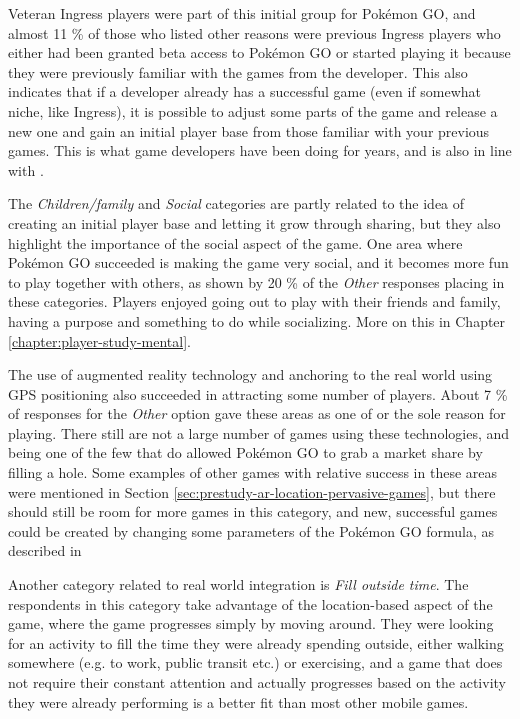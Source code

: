 Veteran Ingress players were part of this initial group for Pokémon GO, and almost 11 \% of those who listed other reasons were previous Ingress players who either had been granted beta access to Pokémon GO or started playing it because they were previously familiar with the games from the developer. This also indicates that if a developer already has a successful game (even if somewhat niche, like Ingress), it is possible to adjust some parts of the game and release a new one and gain an initial player base from those familiar with your previous games. This is what game developers have been doing for years, and is also in line with .

The \emph{Children/family} and \emph{Social} categories are partly related to the idea of creating an initial player base and letting it grow through sharing, but they also highlight the importance of the social aspect of the game. One area where Pokémon GO succeeded is making the game very social, and it becomes more fun to play together with others, as shown by 20 \% of the \emph{Other} responses placing in these categories. Players enjoyed going out to play with their friends and family, having a purpose and something to do while socializing. More on this in Chapter \ref{chapter:player-study-mental}. 

The use of augmented reality technology and anchoring to the real world using GPS positioning also succeeded in attracting some number of players. About 7 \% of responses for the \emph{Other} option gave these areas as one of or the sole reason for playing. There still are not a large number of games using these technologies, and being one of the few that do allowed Pokémon GO to grab a market share by filling a hole. Some examples of other games with relative success in these areas were mentioned in Section \ref{sec:prestudy-ar-location-pervasive-games}, but there should still be room for more games in this category, and new, successful games could be created by changing some parameters of the Pokémon GO formula, as described in 

Another category related to real world integration is \emph{Fill outside time}. The respondents in this category take advantage of the location-based aspect of the game, where the game progresses simply by moving around. They were looking for an activity to fill the time they were already spending outside, either walking somewhere (e.g. to work, public transit etc.) or exercising, and a game that does not require their constant attention and actually progresses based on the activity they were already performing is a better fit than most other mobile games.


